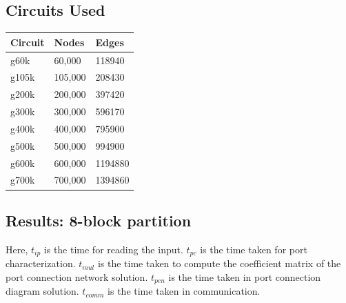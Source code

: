 \documentclass[12pt,psfig,a4]{article}
\begin{document}
\subsection{Circuits Used}
\tiny
\begin{table}[ht]
\begin{center}
\begin{tabular}{|l|l|l|} 
\hline
{\bf Circuit}  & {\bf Nodes } & { \bf Edges }   \\ \hline 
g60k&  60,000  &  118940 \\ \hline 
g105k& 105,000 &  208430 \\ \hline 
g200k& 200,000 &  397420 \\ \hline 
g300k& 300,000 &  596170 \\ \hline 
g400k& 400,000 &  795900 \\ \hline 
g500k& 500,000 &  994900 \\ \hline 
g600k& 600,000 &  1194880\\ \hline 
g700k& 700,000 &  1394860\\ \hline 
\end {tabular}
\end {center}
\end {table}
\normalsize


\subsection{Results: 8-block partition}
Here, $t_{ip}$ is the time for reading the input. $t_{pc}$ is the time taken for port characterization. 
$t_{mul}$ is the time taken to compute the coefficient matrix of the
port connection network solution. $t_{pcn}$ is the time taken in port connection diagram solution. 
$t_{comm}$ is the time taken in communication.
\end{document}
